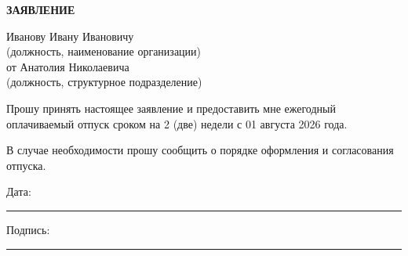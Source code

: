 \documentclass[12pt]{article}
\begin{document}
\begin{center}
\textbf{\LARGE ЗАЯВЛЕНИЕ}
\end{center}

\vspace{1cm}




\noindent
Иванову Ивану Ивановичу\\
(должность, наименование организации)\\
от Анатолия Николаевича\\
(должность, структурное подразделение)

\vspace{0.7cm}

\noindent
Прошу принять настоящее заявление и предоставить мне ежегодный оплачиваемый отпуск сроком на 2 (две) недели с 01 августа 2026 года.  

\vspace{0.3cm}
\noindent
В случае необходимости прошу сообщить о порядке оформления и согласования отпуска.

\vfill

\noindent
Дата: \rule{5cm}{0.4pt} \hfill Подпись: \rule{5cm}{0.4pt}
\end{document}
